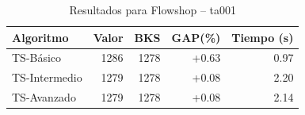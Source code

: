 \begin{table}[h]
\centering
\caption{Resultados para Flowshop -- ta001}
\label{tab:flowshop_ta001}
\begin{tabular}{lrrrr}
\hline
\textbf{Algoritmo} & \textbf{Valor} & \textbf{BKS} & \textbf{GAP(\%)} & \textbf{Tiempo (s)} \\
\hline
TS-Básico & 1286 & 1278 & +0.63 & 0.97 \\
TS-Intermedio & 1279 & 1278 & +0.08 & 2.20 \\
TS-Avanzado & 1279 & 1278 & +0.08 & 2.14 \\
\hline
\end{tabular}
\end{table}
